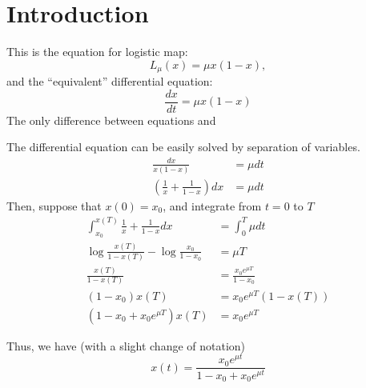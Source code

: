 \documentclass[11pt]{article}
\begin{document}
\section{Introduction}
This is the equation for logistic map:
\begin{equation}
  L_{\mu}(x) = \mu x(1-x),
  \label{logistic}
\end{equation}
and the ``equivalent'' differential equation:
\begin{equation}
  \frac{dx}{dt} = \mu x(1-x)
  \label{logisticdiffeq}
\end{equation}
The only difference between equations  and 

The differential equation  can be easily solved by separation of variables.
\begin{align*}
  \frac{dx}{x(1-x)} &= \mu dt \\  
  \left( \frac{1}{x} + \frac{1}{1-x} \right) dx &= \mu dt
\end{align*}
Then, suppose that $x(0) = x_0$, and integrate from $t = 0$ to $T$
\begin{align*}
  \int_{x_0}^{x(T)} \frac{1}{x} + \frac{1}{1-x} dx &= \int_0^T \mu dt \\
  \log{\frac{x(T)}{1-x(T)}} - \log{\frac{x_0}{1-x_0}} &= \mu T \\
  \frac{x(T)}{1-x(T)} &= \frac{x_0 e^{\mu T}}{1-x_0} \\
  (1-x_0)x(T) &= x_0 e^{\mu T} (1-x(T)) \\
  (1-x_0 + x_0 e^{\mu T})x(T) &= x_0 e^{\mu T}
\end{align*}

Thus, we have (with a slight change of notation)
\begin{equation}
  x(t) = \frac{x_0 e^{\mu t}}{1 - x_0 + x_0 e^{\mu t}}
  \label{eq:logisticdiffeqsoln}
\end{equation}
\end{document}
